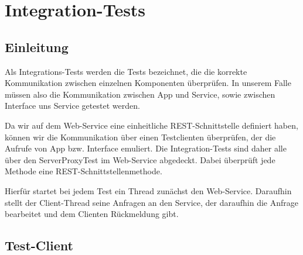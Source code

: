 \section{Integration-Tests}

\subsection{Einleitung}

Als Integrations-Tests werden die Tests bezeichnet, die die korrekte Kommunikation zwischen einzelnen Komponenten überprüfen. In unserem Falle müssen also die Kommunikation zwischen App und Service, sowie zwischen Interface uns Service getestet werden.\par
Da wir auf dem Web-Service eine einheitliche REST-Schnittstelle definiert haben, können wir die Kommunikation über einen  Testclienten überprüfen, der die Aufrufe von App bzw. Interface emuliert. Die Integration-Tests sind daher alle über den ServerProxyTest im Web-Service abgedeckt. Dabei überprüft jede Methode eine REST-Schnittstellenmethode.\par 
Hierfür startet bei jedem Test ein Thread zunächst den Web-Service. Daraufhin stellt der Client-Thread seine Anfragen an den Service, der daraufhin die Anfrage bearbeitet und dem Clienten Rückmeldung gibt.

\subsection{Test-Client}

